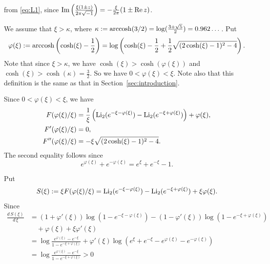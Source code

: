 from  \eqref{eq:L1}, since $\operatorname{Im}\left(\frac{\xi(1\pm z)}{2\pi\sqrt{-1}}\right)=-\frac{\xi}{2\pi}(1\pm\operatorname{Re}{z})$.
\par
We assume that $\xi>\kappa$, where $\kappa:=\operatorname{arccosh}(3/2)=\log(\frac{3+\sqrt{5}}{2})=0.962\dots$.
Put
\begin{equation*}
  \varphi(\xi)
  :=
  \operatorname{arccosh}\left(\cosh(\xi)-\frac{1}{2}\right)
  =
  \log
  \left(
    \cosh(\xi)-\frac{1}{2}+\frac{1}{2}\sqrt{(2\cosh(\xi)-1)^2-4}
  \right).
\end{equation*}
Note that since $\xi>\kappa$, we have $\cosh(\xi)>\cosh(\varphi(\xi))$ and $\cosh(\xi)>\cosh(\kappa)=\frac{3}{2}$.
So we have $0<\varphi(\xi)<\xi$.
Note also that this definition is the same as that in Section~\ref{sec:introduction}.
\par
Since $0<\varphi(\xi)<\xi$, we have
\begin{align}
  F(\varphi(\xi)/\xi)
  &=
  \frac{1}{\xi}
  \left(
    \operatorname{Li}_2(e^{-\xi-\varphi(\xi)})-\operatorname{Li}_2(e^{-\xi+\varphi(\xi)})
  \right)
  +\varphi(\xi),
  \label{eq:F_phi}
  \\
  F'(\varphi(\xi)/\xi)
  &=0,
  \label{eq:F'_phi}
  \\
  F''(\varphi(\xi)/\xi)
  &=
  -\xi\sqrt{(2\cosh(\xi)-1)^2-4}.
  \label{eq:F''_phi}
\end{align}
The second equality follows since
\begin{equation*}
  e^{\varphi(\xi)}+e^{-\varphi(\xi)}
  =
  e^{\xi}+e^{-\xi}-1.
\end{equation*}
\par
Put
\begin{equation*}
  S(\xi)
  :=
  \xi F(\varphi(\xi)/\xi)
  =
  \operatorname{Li}_2(e^{-\xi-\varphi(\xi)})-\operatorname{Li}_2(e^{-\xi+\varphi(\xi)})
  +
  \xi\varphi(\xi).
\end{equation*}
Since
\begin{equation*}
\begin{split}
  \frac{d\,S(\xi)}{d\,\xi}
  &=
  (1+\varphi'(\xi))\log(1-e^{-\xi-\varphi(\xi)})
  -
  (1-\varphi'(\xi))\log(1-e^{-\xi+\varphi(\xi)})
  \\
  &\quad
  +\varphi(\xi)+\xi\varphi'(\xi)
  \\
  &=
  \log\frac{e^{\varphi(\xi)}-e^{-\xi}}{1-e^{-\xi+\varphi(\xi)}}
  +
  \varphi'(\xi)\log\left(e^{\xi}+e^{-\xi}-e^{\varphi(\xi)}-e^{-\varphi(\xi)}\right)
  \\
  &=
  \log\frac{e^{\varphi(\xi)}-e^{-\xi}}{1-e^{-\xi+\varphi(\xi)}}
  >0
\end{split}
\end{equation*}
